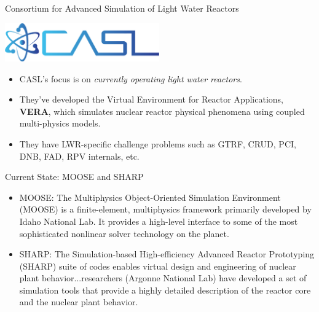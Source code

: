 \documentclass[xcolor=x11names]{beamer}
\begin{document}
\begin{frame}{Consortium for Advanced Simulation of Light Water Reactors}
\begin{center}
\includegraphics[height=0.65in,clip]{CASL}
\end{center}
\begin{itemize}
\item CASL's focus is on \textit{currently operating light water reactors}.
\item They've developed the Virtual Environment for Reactor Applications, \textbf{VERA}, which simulates nuclear reactor physical phenomena using coupled multi-physics models.
\item They have LWR-specific challenge problems such as GTRF, CRUD, PCI, DNB, FAD, RPV internals, etc. \end{itemize}
\end{frame}


\begin{frame}{Current State: MOOSE and SHARP}

\begin{itemize}
\item \textcolor{RawSienna}{MOOSE}: The Multiphysics Object-Oriented Simulation Environment (MOOSE) is a finite-element, multiphysics framework primarily developed by Idaho National Lab. It provides a high-level interface to some of the most sophisticated nonlinear solver technology on the planet.
\pause
\vspace*{1 em}
\item \textcolor{RawSienna}{SHARP}: The Simulation-based High-efficiency Advanced Reactor Prototyping (SHARP) suite of codes enables virtual design and engineering of nuclear plant behavior...researchers (Argonne National Lab) have developed a set of simulation tools that provide a highly detailed description of the reactor core and the nuclear plant behavior. 
\end{itemize}
\end{frame}
\end{document}
